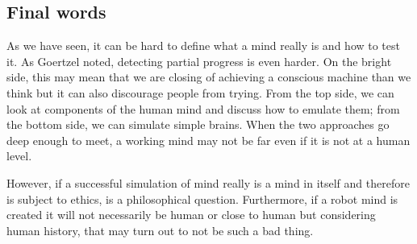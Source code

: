 \documentclass[11pt]{article}
\newenvironment{draft}{\color{dark-cornflower-blue-2}}{\ignorespacesafterend}
\begin{document}
\subsection{Final words}
\begin{draft}

As we have seen, it can be hard to define what a mind really is and how to test it. As Goertzel noted, detecting partial progress is even harder. On the bright side, this may mean that we are closing of achieving a conscious machine than we think but it can also discourage people from trying. From the top side, we can look at components of the human mind and discuss how to emulate them; from the bottom side, we can simulate simple brains. When the two approaches go deep enough to meet, a working mind may not be far even if it is not at a human level.

However, if a successful simulation of mind really is a mind in itself and therefore is subject to ethics, is a philosophical question. Furthermore, if a robot mind is created it will not necessarily be human or close to human but considering human history, that may turn out to not be such a bad thing.

\end{draft}





\end{document}
